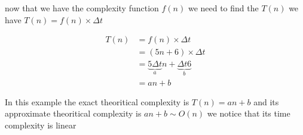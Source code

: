 \vspace{0.5cm}
now that we have the complexity function \(f(n)\) we need to find the \(T(n)\)  we have \(T(n) = f(n) \times \Delta t\)

\begin{align*}
T(n) &= f(n) \times \Delta t\\ 
&= (5n + 6) \times \Delta t \\
&= \underbrace{5 \Delta t}_{a} n + \underbrace{\Delta t 6}_{b} \\
&= \boxed{an+b} 
\end{align*}

\vspace{0.35cm}

In this example the exact theoritical complexity is \(T(n) = an+b\) and its approximate theoritical complexity is 
\(an+b \sim O(n)\) we notice that its time complexity is linear 


